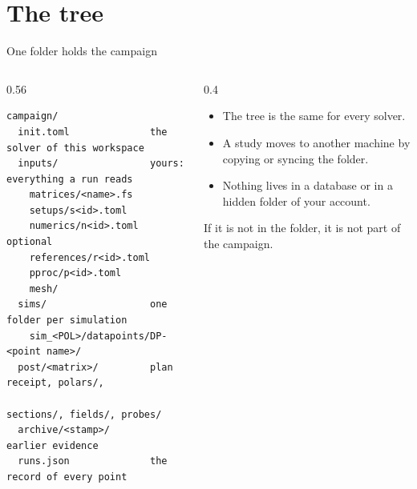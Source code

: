 %
%

\section{The tree}

\begin{frame}[fragile]{One folder holds the campaign}
\begin{columns}[T]
\begin{column}{0.56\textwidth}
\begin{lstlisting}
campaign/
  init.toml              the solver of this workspace
  inputs/                yours: everything a run reads
    matrices/<name>.fs
    setups/s<id>.toml
    numerics/n<id>.toml  optional
    references/r<id>.toml
    pproc/p<id>.toml
    mesh/
  sims/                  one folder per simulation
    sim_<POL>/datapoints/DP-<point name>/
  post/<matrix>/         plan receipt, polars/,
                         sections/, fields/, probes/
  archive/<stamp>/       earlier evidence
  runs.json              the record of every point
\end{lstlisting}
\end{column}
\begin{column}{0.4\textwidth}
\begin{itemize}\small
  \item The tree is the same for every solver.
  \item A study moves to another machine by copying or syncing the folder.
  \item Nothing lives in a database or in a hidden folder of your account.
\end{itemize}
\begin{takeaway}If it is not in the folder, it is not part of the
campaign.\end{takeaway}
\end{column}
\end{columns}
\end{frame}

